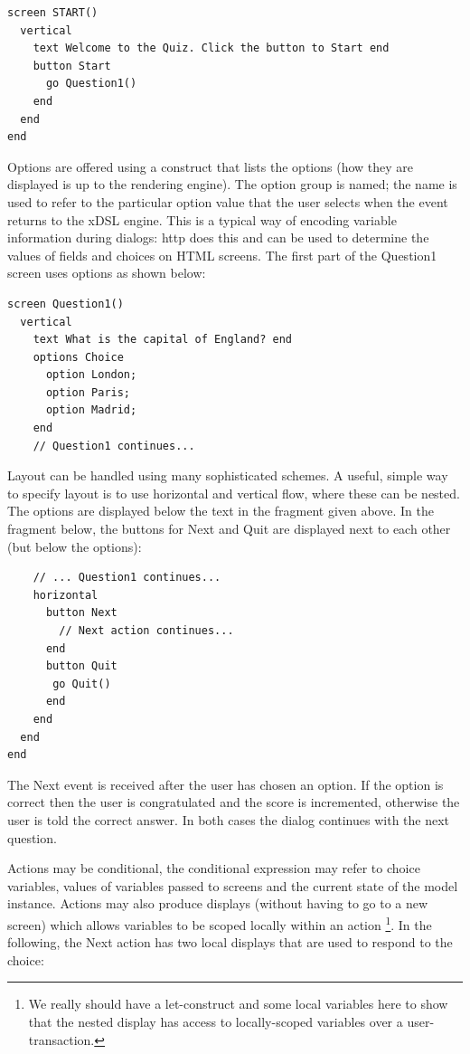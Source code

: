 \begin{lstlisting}
screen START()
  vertical
    text Welcome to the Quiz. Click the button to Start end
    button Start
      go Question1()
    end
  end
end
\end{lstlisting}Options are offered using a construct that lists the options (how
they are displayed is up to the rendering engine). The option group
is named; the name is used to refer to the particular option value
that the user selects when the event returns to the xDSL engine. This
is a typical way of encoding variable information during dialogs:
http does this and can be used to determine the values of fields and
choices on HTML screens. The first part of the Question1 screen uses
options as shown below:

\begin{lstlisting}
screen Question1()
  vertical
    text What is the capital of England? end
    options Choice
      option London; 
      option Paris;
      option Madrid;
    end
    // Question1 continues...
\end{lstlisting}Layout can be handled using many sophisticated schemes. A useful,
simple way to specify layout is to use horizontal and vertical flow,
where these can be nested. The options are displayed below the text
in the fragment given above. In the fragment below, the buttons for
Next and Quit are displayed next to each other (but below the options):

\begin{lstlisting}
    // ... Question1 continues...
    horizontal
      button Next
        // Next action continues...
      end
      button Quit
       go Quit()
      end
    end
  end
end
\end{lstlisting}The Next event is received after the user has chosen an option. If
the option is correct then the user is congratulated and the score
is incremented, otherwise the user is told the correct answer. In
both cases the dialog continues with the next question. 

Actions may be conditional, the conditional expression may refer to
choice variables, values of variables passed to screens and the current
state of the model instance. Actions may also produce displays (without
having to go to a new screen) which allows variables to be scoped
locally within an action %
\footnote{We really should have a let-construct and some local variables here
to show that the nested display has access to locally-scoped variables
over a user-transaction.%
}. In the following, the Next action has two local displays that are
used to respond to the choice:

